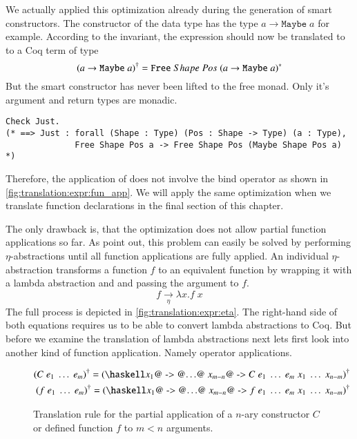 We actually applied this optimization already during the generation of smart constructors.
The constructor  of the  data type has the type $a \rightarrow \texttt{Maybe}\;a$ for example.
According to the invariant, the expression  should now be translated to to a Coq term of type
\[
  {(a \rightarrow \texttt{Maybe}\;a)}^{\dagger}
    = {\texttt{Free}}\;Shape\;Pos\;{{(a \rightarrow \texttt{Maybe}\;a)}^{*}}
\]
But the smart constructor  has never been lifted to the free monad.
Only it's argument and return types are monadic.
\begin{verbatim}
Check Just.
(* ==> Just : forall (Shape : Type) (Pos : Shape -> Type) (a : Type),
              Free Shape Pos a -> Free Shape Pos (Maybe Shape Pos a) *)
\end{verbatim}
Therefore, the application of  does not involve the bind operator as shown in \autoref{fig:translation:expr:fun_app}.
We will apply the same optimization when we translate function declarations in the final section of this chapter.

The only drawback is, that the optimization does not allow partial function applications so far.
As \cite{Abel:2005} point out, this problem can easily be solved by performing $\eta$-abstractions until all function applications are fully applied.
An individual $\eta$-abstraction transforms a function $f$ to an equivalent function by wrapping it with a lambda abstraction and and passing the argument to $f$.
\[
  f \xrightarrow[\eta]{} \lambda x. f\;x
\]
The full process is depicted in \autoref{fig:translation:expr:eta}.
The right-hand side of both equations requires us to be able to convert lambda abstractions to Coq.
But before we examine the translation of lambda abstractions next lets first look into another kind of function application.
Namely operator applications.
\begin{figure}[H]
  \begin{align*}
    \toCoq{(C\;e_1\;\ldots\;e_m)} = \toCoq{(\haskellM{\@$x_1$@ -> @$\ldots$@ \@$x_{m - n}$@ ->}\; C\;e_1\;\ldots\;e_m\;x_1\;\ldots\;x_{n - m})} \\
    \toCoq{(f\;e_1\;\ldots\;e_m)} = \toCoq{(\haskellM{\@$x_1$@ -> @$\ldots$@ \@$x_{m - n}$@ ->}\; f\;e_1\;\ldots\;e_m\;x_1\;\ldots\;x_{n - m})}
  \end{align*}
  \caption{Translation rule for the partial application of a $n$-ary constructor $C$ or defined function $f$ to $m < n$ arguments.}
  \label{fig:translation:expr:eta}
\end{figure}

